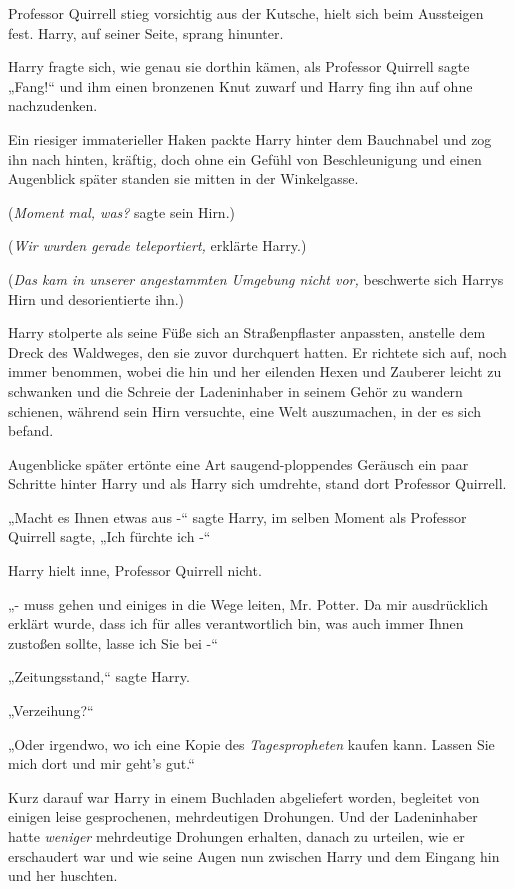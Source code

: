 {Professor Quirrell stieg vorsichtig aus der Kutsche, hielt sich beim Aussteigen fest. Harry, auf seiner Seite, sprang hinunter.

Harry fragte sich, wie genau sie dorthin kämen, als Professor Quirrell sagte „Fang!“ und ihm einen bronzenen Knut zuwarf und Harry fing ihn auf ohne nachzudenken.

Ein riesiger immaterieller Haken packte Harry hinter dem Bauchnabel und zog ihn nach hinten, kräftig, doch ohne ein Gefühl von Beschleunigung und einen Augenblick später standen sie mitten in der Winkelgasse.

(\emph{Moment mal, was?} sagte sein Hirn.)

(\emph{Wir wurden gerade teleportiert,} erklärte Harry.)

(\emph{Das kam in unserer angestammten Umgebung nicht vor,} beschwerte sich Harrys Hirn und desorientierte ihn.)

Harry stolperte als seine Füße sich an Straßenpflaster anpassten, anstelle dem Dreck des Waldweges, den sie zuvor durchquert hatten. Er richtete sich auf, noch immer benommen, wobei die hin und her eilenden Hexen und Zauberer leicht zu schwanken und die Schreie der Ladeninhaber in seinem Gehör zu wandern schienen, während sein Hirn versuchte, eine Welt auszumachen, in der es sich befand.

Augenblicke später ertönte eine Art saugend-ploppendes Geräusch ein paar Schritte hinter Harry und als Harry sich umdrehte, stand dort Professor Quirrell.

„Macht es Ihnen etwas aus -“ sagte Harry, im selben Moment als Professor Quirrell sagte, „Ich fürchte ich -“

Harry hielt inne, Professor Quirrell nicht.

„- muss gehen und einiges in die Wege leiten, Mr. Potter. Da mir ausdrücklich erklärt wurde, dass ich für alles verantwortlich bin, was auch immer Ihnen zustoßen sollte, lasse ich Sie bei -“

„Zeitungsstand,“ sagte Harry.

„Verzeihung?“

„Oder irgendwo, wo ich eine Kopie des \emph{Tagespropheten} kaufen kann. Lassen Sie mich dort und mir geht's gut.“

Kurz darauf war Harry in einem Buchladen abgeliefert worden, begleitet von einigen leise gesprochenen, mehrdeutigen Drohungen. Und der Ladeninhaber hatte \emph{weniger} mehrdeutige Drohungen erhalten, danach zu urteilen, wie er erschaudert war und wie seine Augen nun zwischen Harry und dem Eingang hin und her huschten.

}
